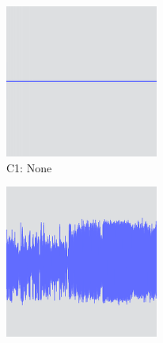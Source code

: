 \begin{figure}[ht]
  \centering
  \begin{subfigure}{.3\textwidth}
    \centering
    \includegraphics[width=\columnwidth]{figs/condition1.png}
    \caption{C1: None}
  \end{subfigure}
  \begin{subfigure}{.3\textwidth}
    \centering
    \includegraphics[width=\columnwidth]{figs/condition2.png}

\end{subfigure}
\end{figure}
